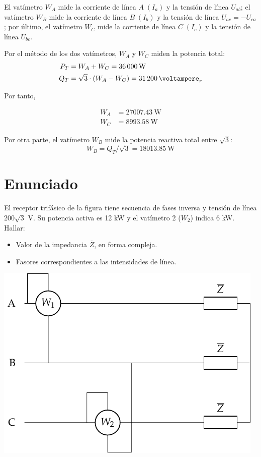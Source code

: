 El vatímetro $W_A$ mide la corriente de línea $A\;(I_a)$ y la tensión de línea $U_{ab}$; el vatímetro $W_B$ mide la corriente de línea $B\;(I_b)$ y la tensión de línea $U_{ac}=-U_{ca}$; por último, el vatímetro $W_C$ mide la corriente de línea $C\;(I_c)$ y la tensión de línea $U_{bc}$.

Por el método de los dos vatímetros, $W_A$ y $W_C$ miden la potencia total: 
\begin{align*}
  P_T &= W_A + W_C =\qty{36000}{\watt}\\
  Q_T &= \sqrt{3}\cdot (W_A - W_C) = \qty{31200}{\voltampere}_r
\end{align*}

Por tanto,

\begin{align*}
  W_A &= \qty{27007.43}{\watt}\\
  W_C &= \qty{8993.58}{\watt}
\end{align*}

Por otra parte, el vatímetro $W_B$ mide la potencia reactiva total entre $\sqrt{3}$:
\begin{equation*}
  W_B = Q_T/\sqrt{3}=\qty{18013.85}{\watt}
\end{equation*}



\section{Enunciado}
 
El receptor trifásico de la figura tiene secuencia de fases inversa y tensión de línea 200$\sqrt{3}$ V. Su potencia activa es 12 kW y el vatímetro 2 ($W_2$) indica 6 kW. Hallar:
\begin{itemize}
    \item Valor de la impedancia $\overline{Z}$, en forma compleja.
    \item Fasores correspondientes a las intensidades de línea.
\end{itemize}

\begin{center}
  \includegraphics[width=0.45\linewidth]{figuras/ej6_BT3.pdf}
\end{center}

